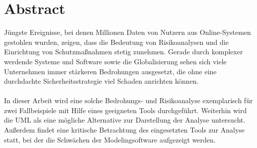 \section*{Abstract}
Jüngste Ereignisse, bei denen Millionen Daten von Nutzern aus Online-Systemen gestohlen wurden, zeigen, dass die Bedeutung von Risikoanalysen und die Einrichtung von Schutzmaßnahmen stetig zunehmen. Gerade durch komplexer werdende Systeme und Software sowie die Globalisierung sehen sich viele Unternehmen immer stärkeren Bedrohungen ausgesetzt, die ohne eine durchdachte Sicherheitsstrategie viel Schaden anrichten können. 
\\
\\
In dieser Arbeit wird eine solche Bedrohungs- und Risikoanalyse exemplarisch für zwei Fallbeispiele mit Hilfe eines geeigneten Tools durchgeführt. Weiterhin wird die UML als eine mögliche Alternative zur Darstellung der Analyse untersucht. Außerdem findet eine kritische Betrachtung des eingesetzten Tools zur Analyse statt, bei der die Schwächen der Modelingsoftware aufgezeigt werden.